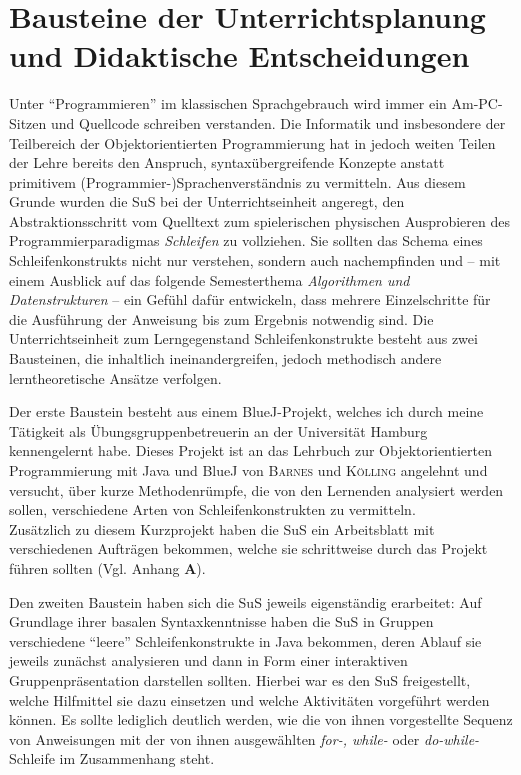 \documentclass[paper=a4, DIV=13, BCOR=12mm, twoside=on, onecolumn=on, open = any, titlepage =on, parskip =half-, headsepline = on, footsepline = on, chapterprefix = on, sectionprefix = on, appendixprefix = off, fontsize = 11pt, numbers = noenddot, abstract = off]{scrreprt}
\begin{document}
\par \singlespacing
 \section{Bausteine der Unterrichtsplanung und Didaktische Entscheidungen}
\onehalfspacing
Unter "`Programmieren"' im klassischen Sprachgebrauch wird immer ein Am-PC-Sitzen und Quellcode schreiben verstanden. Die Informatik und insbesondere der Teilbereich der Objektorientierten Programmierung hat in jedoch weiten Teilen der Lehre bereits den Anspruch, syntaxübergreifende Konzepte anstatt primitivem (Programmier-)Sprachenverständnis zu vermitteln.  Aus diesem Grunde wurden die SuS bei der Unterrichtseinheit angeregt, den Abstraktionsschritt vom Quelltext zum spielerischen physischen Ausprobieren des Programmierparadigmas \emph{Schleifen} zu vollziehen. Sie sollten das Schema eines Schleifenkonstrukts nicht nur verstehen, sondern auch nachempfinden und -- mit einem Ausblick auf das folgende Semesterthema \emph{Algorithmen und Datenstrukturen} -- ein Gefühl dafür entwickeln, dass mehrere Einzelschritte für die Ausführung der Anweisung bis zum Ergebnis notwendig sind.  
Die Unterrichtseinheit zum Lerngegenstand Schleifenkonstrukte besteht aus zwei Bausteinen, die inhaltlich ineinandergreifen, jedoch methodisch andere lerntheoretische Ansätze verfolgen. 

Der erste Baustein besteht aus einem BlueJ-Projekt, welches ich durch meine Tätigkeit als Übungsgruppenbetreuerin an der Universität Hamburg kennengelernt habe. Dieses Projekt ist an das Lehrbuch zur Objektorientierten Programmierung mit Java und BlueJ von \textsc{Barnes} und \textsc{Kölling} angelehnt und versucht, über kurze Methodenrümpfe, die von den Lernenden analysiert werden sollen, verschiedene Arten von Schleifenkonstrukten zu vermitteln.\\
Zusätzlich zu diesem Kurzprojekt haben die SuS ein Arbeitsblatt mit verschiedenen Aufträgen bekommen, welche sie schrittweise durch das Projekt führen sollten (Vgl. Anhang \textbf{A}).

Den zweiten Baustein haben sich die SuS jeweils eigenständig erarbeitet: Auf Grundlage ihrer basalen Syntaxkenntnisse haben die SuS in Gruppen verschiedene "`leere"' Schleifenkonstrukte in Java bekommen, deren Ablauf sie jeweils zunächst analysieren und dann in Form einer interaktiven Gruppenpräsentation darstellen sollten. Hierbei war es den SuS freigestellt, welche Hilfmittel sie dazu einsetzen und welche Aktivitäten vorgeführt werden können. Es sollte lediglich deutlich werden, wie die von ihnen vorgestellte Sequenz von Anweisungen mit der von ihnen ausgewählten \emph{for-, while-} oder \emph{do-while-}Schleife im Zusammenhang steht.
\end{document}
